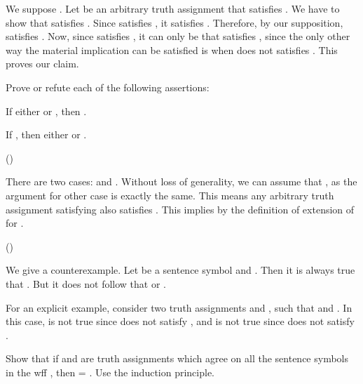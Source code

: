 		We suppose . Let  be an arbitrary truth assignment that satisfies . We have to show that  satisfies . Since  satisfies , it satisfies . Therefore, by our supposition,  satisfies . Now, since  satisfies , it can only be that  satisfies , since the only other way the material implication can be satisfied is when  does not satisfies . This proves our claim.
	\stopsolution

	\startexercise [title={Enderton, 1.2.5}]
		Prove or refute each of the following assertions:
		\startitemize[a, joinedup]
			\item  If either  or , then .
			\item  If , then either  or .
		\stopitemize
	\stopexercise
	\startsolution
		\startitemize[a]
			\item  ()

				There are two cases:  and . Without loss of generality, we can assume that , as the argument for other case is exactly the same. This means any arbitrary truth assignment  satisfying  also satisfies . This implies  by the definition of extension of  for .

			\item  ()

				We give a counterexample. Let  be a sentence symbol and . Then it is always true that . But it does not follow that  or .

				For an explicit example, consider two truth assignments  and , such that  and . In this case,  is not true since  does not satisfy , and  is not true since  does not satisfy .
		\stopitemize
	\stopsolution

	\startexercise [title={Enderton, 1.2.6}]
		\startitemize[a, joinedup]

			\item  Show that if  and  are truth assignments which agree on all the sentence symbols in the wff , then  = . Use the induction principle.
			

